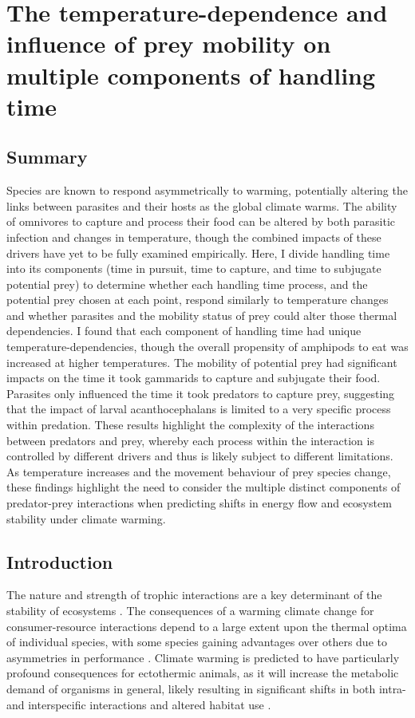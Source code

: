\chapter[The temperature-dependence and influence of prey mobility on multiple components of handling time]{The temperature-dependence and influence of prey mobility on multiple components of handling time}
\label{chap:feeding}

\section{Summary}
Species are known to respond asymmetrically to warming, potentially altering the links between parasites and their hosts as the global climate warms. The ability of omnivores to capture and process their food can be altered by both parasitic infection and changes in temperature, though the combined impacts of these drivers have yet to be fully examined empirically. Here, I divide handling time into its components (time in pursuit, time to capture, and time to subjugate potential prey) to determine whether each handling time process, and the potential prey chosen at each point, respond similarly to temperature changes and whether parasites and the mobility status of prey could alter those thermal dependencies. I found that each component of handling time had unique temperature-dependencies, though the overall propensity of amphipods to eat was increased at higher temperatures. The mobility of potential prey had significant impacts on the time it took gammarids to capture and subjugate their food. Parasites only influenced the time it took predators to capture prey, suggesting that the impact of larval acanthocephalans is limited to a very specific process within predation. These results highlight the complexity of the interactions between predators and prey, whereby each process within the interaction is controlled by different drivers and thus is likely subject to different limitations. As temperature increases and the movement behaviour of prey species change, these findings highlight the need to consider the multiple distinct components of predator-prey interactions when predicting shifts in energy flow and ecosystem stability under climate warming.


\section{Introduction}

The nature and strength of trophic interactions are a key determinant of the stability of ecosystems \citep{may1974, pimm1984, ogorman2009, allesina2012, donohue2016, donohue2017, delong2018}. The consequences of a warming climate change for consumer-resource interactions depend to a large extent upon the thermal optima of individual species, with some species gaining advantages over others due to asymmetries in performance \citep{dell2014, penk2016}. Climate warming is predicted to have particularly profound consequences for ectothermic animals, as it will increase the metabolic demand of organisms in general, likely resulting in significant shifts in both intra- and interspecific interactions and altered habitat use \citep{kordas2011, abram2017, vandervorste2017}. 

